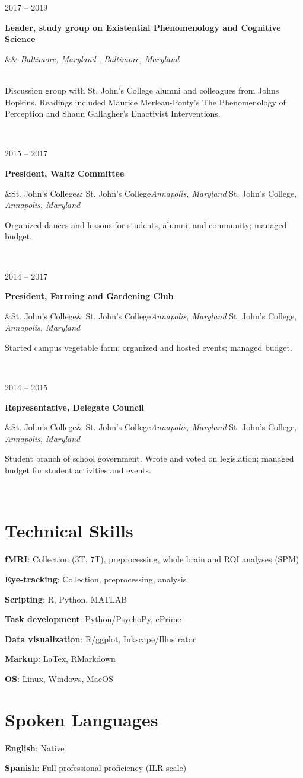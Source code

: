 \documentclass{article}
\newcommand{\entry}[5]{

  \begin{minipage}[t]{.15\textwidth}
    \begin{flushright}
      \hfill {#1}
    \end{flushright}
  \end{minipage}
  \hfill\vline\hfill
  \begin{minipage}[t]{.80\textwidth}
    \textbf{#2}

    \ifx&#3&
      {#3}\textit{#4}
    \else
      {#3, }\textit{#4}

    \fi
    \footnotesize{#5}
  \end{minipage}\\\vspace{.25cm}

}
\newcommand{\skillentry}[2]{
  {\textbf{#1}:}
  {#2}
  \vspace{.25cm}
}
\newcommand{\sjc}{St. John's College}
\begin{document}
\entry{2017 -- 2019}{Leader, study group on Existential Phenomenology and Cognitive Science}
{}{Baltimore, Maryland}
{\\ Discussion group with St. John’s College alumni and colleagues from Johns Hopkins. Readings included Maurice Merleau-Ponty’s The Phenomenology of Perception and Shaun Gallagher’s Enactivist Interventions.}

\entry{2015 -- 2017}{President, Waltz Committee}
{\sjc}{Annapolis, Maryland}
{Organized dances and lessons for students, alumni, and community; managed budget.}

\entry{2014 -- 2017}{President, Farming and Gardening Club}
{\sjc}{Annapolis, Maryland}
{Started campus vegetable farm; organized and hosted events; managed budget.}

\entry{2014 -- 2015}{Representative, Delegate Council}
{\sjc}{Annapolis, Maryland}
{Student branch of school government. Wrote and voted on legislation; managed budget for student activities and events.}

\section{Technical Skills}

\skillentry{fMRI}
{Collection (3T, 7T), preprocessing, whole brain and ROI analyses (SPM)}

\skillentry{Eye-tracking}{Collection, preprocessing, analysis}

\skillentry{Scripting}{R, Python, MATLAB}

\skillentry{Task development}
{Python/PsychoPy, ePrime}

\skillentry{Data visualization}{R/ggplot, Inkscape/Illustrator}

\skillentry{Markup}{LaTex, RMarkdown}

\skillentry{OS}{Linux, Windows, MacOS}

\section{Spoken Languages}
\skillentry{English}{Native}

\skillentry{Spanish}{Full professional proficiency (ILR scale)}
\end{document}
